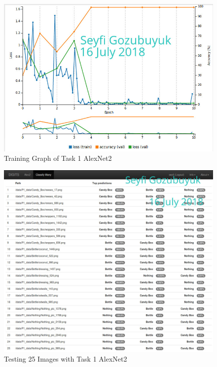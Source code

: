 \documentclass[10pt,journal,compsoc]{IEEEtran}
\begin{document}
\begin{figure}[thpb]
      \centering
      \includegraphics[width=\linewidth]{figures/t1a2g.png}
      \caption{Training Graph of Task 1 AlexNet2}
      \label{fig:t1a2g}
\end{figure}

\begin{figure}[thpb]
      \centering
      \includegraphics[width=\linewidth]{figures/t1a2l.png}
      \caption{Testing 25 Images with Task 1 AlexNet2}
      \label{fig:t1a2l}
\end{figure}
\end{document}
